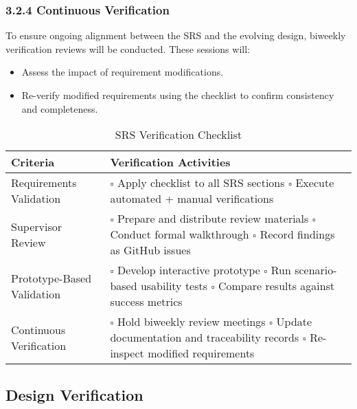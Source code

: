 \documentclass[12pt, titlepage]{article}
\begin{document}
\subsubsection*{3.2.4 Continuous Verification}
To ensure ongoing alignment between the SRS and the evolving design, biweekly verification reviews will be conducted. These sessions will:
\begin{itemize}
    \item Assess the impact of requirement modifications.
    \item Re-verify modified requirements using the checklist to confirm consistency and completeness.
\end{itemize}


\begin{table}[H]
\centering
\caption{SRS Verification Checklist}
\renewcommand{\arraystretch}{1.3}
\begin{tabular}{|p{5cm}|p{9cm}|}
\hline
\textbf{Criteria} & \textbf{Verification Activities} \\ \hline

Requirements Validation &
\(\square\) Apply checklist to all SRS sections \newline
\(\square\) Execute automated + manual verifications \\ \hline

Supervisor Review &
\(\square\) Prepare and distribute review materials \newline
\(\square\) Conduct formal walkthrough \newline
\(\square\) Record findings as GitHub issues \\ \hline

Prototype-Based Validation &
\(\square\) Develop interactive prototype \newline
\(\square\) Run scenario-based usability tests \newline
\(\square\) Compare results against success metrics \\ \hline

Continuous Verification &
\(\square\) Hold biweekly review meetings \newline
\(\square\) Update documentation and traceability records \newline
\(\square\) Re-inspect modified requirements \\ \hline

\end{tabular}
\end{table}


\subsection{Design Verification}
\end{document}
